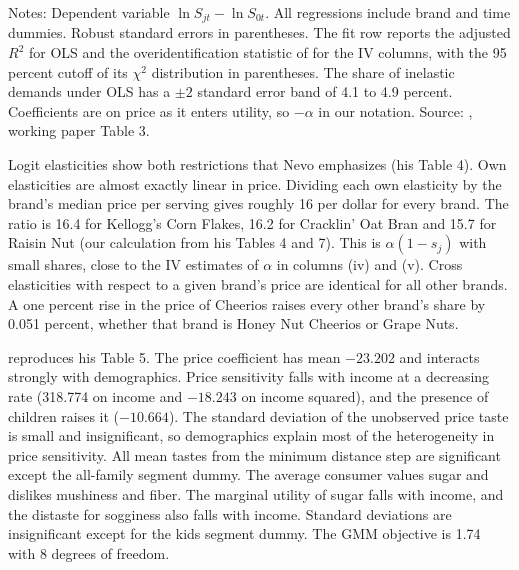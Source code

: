 \begin{table}[htbp]
\smallskip
\begin{minipage}{0.95\linewidth}
\footnotesize
Notes: Dependent variable $\ln S_{jt} - \ln S_{0t}$. All regressions include brand and time dummies. Robust standard
errors in parentheses. The fit row reports the adjusted $R^2$ for OLS and the overidentification statistic of
\citet{Hausman1983} for the IV columns, with the 95 percent cutoff of its $\chi^2$ distribution in parentheses. The share of
inelastic demands under OLS has a $\pm 2$ standard error band of 4.1 to 4.9 percent. Coefficients are on price as it
enters utility, so $-\alpha$ in our notation. Source: \citet{Nevo2000b}, working paper Table 3.
\end{minipage}
\end{table}

Logit elasticities show both restrictions that Nevo emphasizes (his Table 4). Own elasticities are almost exactly
linear in price. Dividing each own elasticity by the brand's median price per serving gives roughly 16 per dollar for
every brand. The ratio is 16.4 for Kellogg's Corn Flakes, 16.2 for Cracklin' Oat Bran and 15.7 for Raisin Nut (our
calculation from his Tables 4 and 7). This is $\alpha(1 - s_j)$ with small shares, close to the IV estimates of $\alpha$ in columns (iv)
and (v). Cross elasticities with respect to a given brand's price are identical for all other brands. A one percent
rise in the price of Cheerios raises every other brand's share by 0.051 percent, whether that brand is Honey Nut
Cheerios or Grape Nuts.

  reproduces his Table 5. The price coefficient has mean
$-23.202$ and interacts strongly with demographics. Price sensitivity falls with income at a decreasing rate (318.774
on income and $-18.243$ on income squared), and the presence of children raises it ($-10.664$). The standard deviation
of the unobserved price taste is small and insignificant, so demographics explain most of the heterogeneity in price
sensitivity. All mean tastes from the minimum distance step are significant except the all-family segment dummy. The
average consumer values sugar and dislikes mushiness and fiber. The marginal utility of sugar falls with income, and the
distaste for sogginess also falls with income. Standard deviations are insignificant except for the kids segment dummy.
The GMM objective is 1.74 with 8 degrees of freedom.

